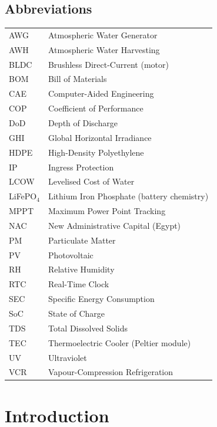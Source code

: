 \documentclass[12pt,a4paper]{report}
\numberwithin{equation}{chapter}
\numberwithin{figure}{chapter}
\numberwithin{table}{chapter}
\begin{document}
\vspace{1em}
\section*{Abbreviations}

\begin{tabular}{@{}ll@{}}
AWG    & Atmospheric Water Generator \\
AWH    & Atmospheric Water Harvesting \\
BLDC   & Brushless Direct-Current (motor) \\
BOM    & Bill of Materials \\
CAE    & Computer-Aided Engineering \\
COP    & Coefficient of Performance \\
DoD    & Depth of Discharge \\
GHI    & Global Horizontal Irradiance \\
HDPE   & High-Density Polyethylene \\
IP     & Ingress Protection \\
LCOW   & Levelised Cost of Water \\
LiFePO$_4$ & Lithium Iron Phosphate (battery chemistry) \\
MPPT   & Maximum Power Point Tracking \\
NAC    & New Administrative Capital (Egypt) \\
PM     & Particulate Matter \\
PV     & Photovoltaic \\
RH     & Relative Humidity \\
RTC    & Real-Time Clock \\
SEC    & Specific Energy Consumption \\
SoC    & State of Charge \\
TDS    & Total Dissolved Solids \\
TEC    & Thermoelectric Cooler (Peltier module) \\
UV     & Ultraviolet \\
VCR    & Vapour-Compression Refrigeration \\
\end{tabular}
\newpage

\chapter{Introduction}
\end{document}
